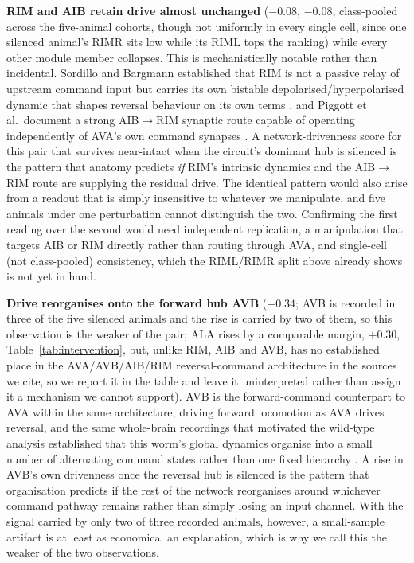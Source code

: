 \documentclass[11pt]{article}
\begin{document}
\textbf{RIM and AIB retain drive almost unchanged} ($-0.08$, $-0.08$,
class-pooled across the five-animal cohorts, though not uniformly in every
single cell, since one silenced animal's RIMR sits low while its RIML
tops the ranking) while every other module member collapses. This is mechanistically
notable rather than incidental. Sordillo and Bargmann established that RIM
is not a passive relay of upstream command input but carries its own
bistable depolarised/hyperpolarised dynamic that shapes reversal behaviour
on its own terms \citep{sordillo2021}, and Piggott et al.\ document a
strong AIB$\to$RIM synaptic route capable of operating independently of
AVA's own command synapses \citep{piggott2011}. A network-drivenness score
for this pair that survives near-intact when the circuit's dominant hub is
silenced is the pattern that anatomy predicts \emph{if} RIM's intrinsic
dynamics and the AIB$\to$RIM route are supplying the residual drive. The identical
pattern would also arise from a readout that is simply
insensitive to whatever we manipulate, and five animals under one
perturbation cannot distinguish the two. Confirming the first reading over
the second would need independent replication, a manipulation that targets
AIB or RIM directly rather than routing through AVA, and single-cell (not class-pooled) consistency, which the RIML/RIMR split
above already shows is not yet in hand.

\textbf{Drive reorganises onto the forward hub AVB} ($+0.34$; AVB is
recorded in three of the five silenced animals and the rise is carried by
two of them, so this observation is the weaker of the pair; ALA rises by a
comparable margin, $+0.30$, Table~\ref{tab:intervention}, but, unlike RIM, AIB and AVB, has no established place in the AVA/AVB/AIB/RIM
reversal-command architecture in the sources we cite, so we report it in
the table and leave it uninterpreted rather than assign it a mechanism we
cannot support). AVB is the forward-command counterpart to AVA within the
same architecture, driving forward locomotion as AVA drives reversal, and
the same whole-brain recordings that motivated the wild-type analysis
established that this worm's global dynamics organise into a small number
of alternating command states rather than one fixed hierarchy
\citep{kato2015}. A rise in AVB's own drivenness once the reversal hub is
silenced is the pattern that organisation predicts if the rest of the
network reorganises around whichever command pathway remains rather than
simply losing an input channel. With the signal carried by only two of
three recorded animals, however, a small-sample artifact is at least as
economical an explanation, which is why we call this the weaker of the two
observations.
\end{document}
